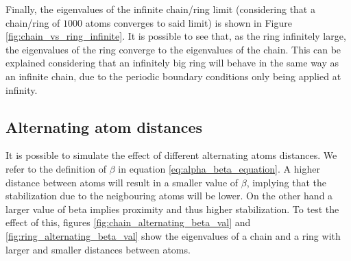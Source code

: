 \documentclass{article}
\begin{document}
Finally, the eigenvalues of the infinite chain/ring limit (considering that a chain/ring of $1000$ atoms converges to said limit) is shown in Figure \ref{fig:chain_vs_ring_infinite}. It is possible to see that, as the ring infinitely large, the eigenvalues of the ring converge to the eigenvalues of the chain. This can be explained considering that an infinitely big ring will behave in the same way as an infinite chain, due to the periodic boundary conditions only being applied at infinity. 

\subsection{Alternating atom distances}
It is possible to simulate the effect of different alternating atoms distances. We refer to the definition of $\beta$ in equation \ref{eq:alpha_beta_equation}. A higher distance between atoms will result in a smaller value of $\beta$, implying that the stabilization due to the neigbouring atoms will be lower. On the other hand a larger value of beta implies proximity and thus higher stabilization. To test the effect of this, figures \ref{fig:chain_alternating_beta_val} and \ref{fig:ring_alternating_beta_val} show the eigenvalues of a chain and a ring with larger and smaller distances between atoms.
\end{document}
